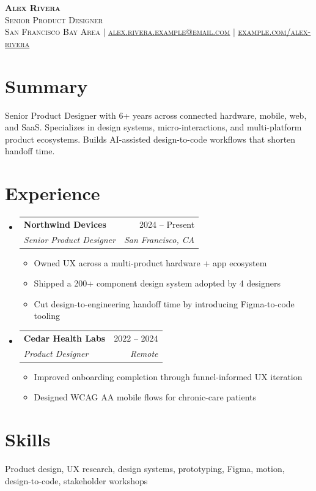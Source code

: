\documentclass[letterpaper,11pt]{article}
\makeatletter
\newcommand{\resumeItem}[1]{\item\small{#1 \vspace{2pt}}}
\newcommand{\resumeSubheading}[4]{
  \vspace{-2pt}\item
  \begin{tabular*}{0.97\textwidth}[t]{l@{\extracolsep{\fill}}r}
    \textbf{#1} & #2 \\
    \textit{\small#3} & \textit{\small #4} \\
  \end{tabular*}\vspace{-7pt}
}
\newcommand{\resumeSubHeadingListStart}{\begin{itemize}[leftmargin=0.15in, label={}]}
\newcommand{\resumeSubHeadingListEnd}{\end{itemize}}
\newcommand{\resumeItemListStart}{\begin{itemize}}
\newcommand{\resumeItemListEnd}{\end{itemize}\vspace{-5pt}}
\makeatother
\begin{document}
\begin{center}
  \textbf{\Huge \scshape Alex Rivera} \\ \vspace{2pt}
  \small \scshape Senior Product Designer \\ \vspace{8pt}
  \footnotesize San Francisco Bay Area
  \enspace$\vert$\enspace
  \href{mailto:alex.rivera.example@email.com}{\underline{alex.rivera.example@email.com}}
  \enspace$\vert$\enspace
  \href{https://example.com/alex-rivera}{\underline{example.com/alex-rivera}}
\end{center}

\section{Summary}
\small{
Senior Product Designer with 6+ years across connected hardware, mobile, web, and SaaS.
Specializes in design systems, micro-interactions, and multi-platform product ecosystems.
Builds AI-assisted design-to-code workflows that shorten handoff time.
}

\section{Experience}
\resumeSubHeadingListStart
  \resumeSubheading
  {Northwind Devices}{2024 -- Present}
  {Senior Product Designer}{San Francisco, CA}
  \resumeItemListStart
    \resumeItem{Owned UX across a multi-product hardware + app ecosystem}
    \resumeItem{Shipped a 200+ component design system adopted by 4 designers}
    \resumeItem{Cut design-to-engineering handoff time by introducing Figma-to-code tooling}
  \resumeItemListEnd
  \resumeSubheading
  {Cedar Health Labs}{2022 -- 2024}
  {Product Designer}{Remote}
  \resumeItemListStart
    \resumeItem{Improved onboarding completion through funnel-informed UX iteration}
    \resumeItem{Designed WCAG AA mobile flows for chronic-care patients}
  \resumeItemListEnd
\resumeSubHeadingListEnd

\section{Skills}
\small{Product design, UX research, design systems, prototyping, Figma, motion, design-to-code, stakeholder workshops}
\end{document}
